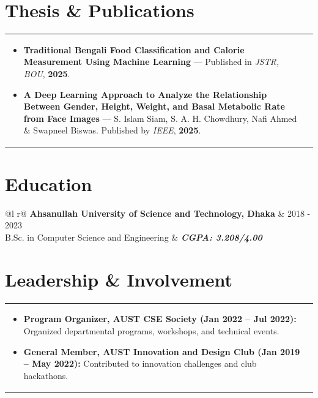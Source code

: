 \documentclass[a4paper,8pt]{article}
\begin{document}
\vspace{2pt}
\section{Thesis \& Publications}
\begin{tabularx}{\linewidth}{ @{}l r@{} }
\begin{minipage}[t]{\linewidth}
\begin{itemize}[nosep, after=\strut, leftmargin=1.5em, itemsep=1.5pt]
\item \textbf{Traditional Bengali Food Classification and Calorie Measurement Using Machine Learning} — Published in \textit{JSTR, BOU}, \textbf{2025}.
\item \textbf{A Deep Learning Approach to Analyze the Relationship Between Gender, Height, Weight, and Basal Metabolic Rate from Face Images} — S. Islam Siam, S. A. H. Chowdhury, Nafi Ahmed \& Swapneel Biswas. Published by \textit{IEEE}, \textbf{2025}.
\end{itemize}
\end{minipage}
\end{tabularx}

\vspace{2pt}
\section{Education}
\begin{tabularx}{\linewidth}{ @{}l r@{} }
\color[HTML]{1C033C} \textbf{Ahsanullah University of Science and Technology, Dhaka} & \hfill \color[HTML]{371e77} 2018 - 2023 \\
\color[HTML]{371e77} B.Sc. in Computer Science and Engineering & \hfill \color[HTML]{4B28A4} \textit{\textbf{CGPA: 3.208/4.00}} \\
\end{tabularx}

\vspace{2pt}
\section{Leadership \& Involvement}
\begin{tabularx}{\linewidth}{ @{}l r@{} }
\begin{minipage}[t]{\linewidth}
\begin{itemize}[nosep,after=\strut, leftmargin=1.5em, itemsep=1.5pt]
\item \textbf{Program Organizer, AUST CSE Society (Jan 2022 – Jul 2022):} Organized departmental programs, workshops, and technical events.
\item \textbf{General Member, AUST Innovation and Design Club (Jan 2019 – May 2022):} Contributed to innovation challenges and club hackathons.
\end{itemize}
\end{minipage}
\end{tabularx}
\end{document}
